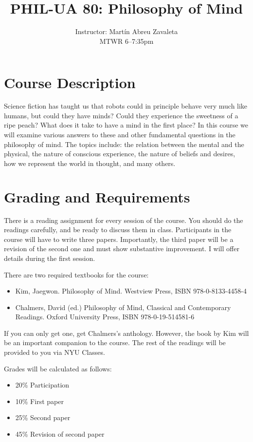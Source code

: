 \documentclass[11pt]{article}
\title{PHIL-UA 80: Philosophy of Mind}
\author{Instructor: Mart\'{i}n Abreu Zavaleta\\ MTWR 6--7:35pm}
\date{} %
\begin{document}
\maketitle  %
\allsectionsfont{\mdseries}
\section{Course Description}
Science fiction has taught us that robots could in principle behave very much like humans, but could they have minds? Could they experience the sweetness of a ripe peach? What does it take to have a mind in the first place? In this course we will examine various answers to these and other fundamental questions in the philosophy of mind. The topics include: the relation between the mental and the physical, the nature of conscious experience, the nature of beliefs and desires, how we represent the world in thought, and many others.

\section{Grading and Requirements}

There is a reading assignment for every session of the course. You should do the readings carefully, and be ready to discuss them in class. Participants in the course will have to write three papers. Importantly, the third paper will be a revision of the second one and must show substantive improvement. I will offer details during the first session.

There are two required textbooks for the course:
\begin{itemize}
\item Kim, Jaegwon. Philosophy of Mind. Westview Press, ISBN 978-0-8133-4458-4
\item Chalmers, David (ed.) Philosophy of Mind, Classical and Contemporary Readings. Oxford University Press, ISBN 978-0-19-514581-6
\end{itemize}
If you can only get one, get Chalmers's anthology. However, the book by Kim will be an important companion to the course. The rest of the readings will be provided to you via NYU Classes.


Grades will be calculated as follows:
\begin{itemize}
\item 20\% Participation
\item 10\% First paper
\item 25\% Second paper
\item 45\% Revision of second paper
\end{itemize}
\end{document}
